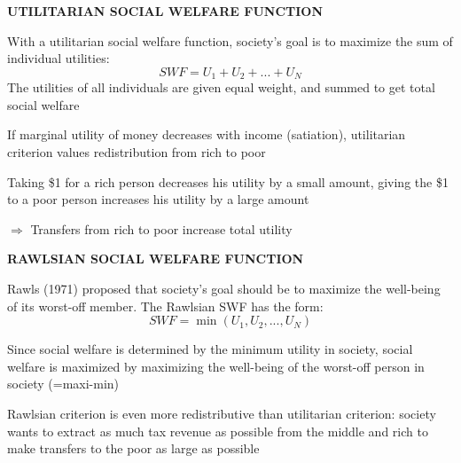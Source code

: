 \documentclass[landscape]{slides}
\begin{document}
\begin{slide}
\begin{center}
{\bf UTILITARIAN SOCIAL WELFARE FUNCTION}
\end{center}

With a utilitarian social welfare function, society's goal is to maximize the sum of individual utilities:
$$SWF=U_1+U_2+...+U_N$$
The utilities of all individuals are given equal weight, and summed to get total social welfare

If marginal utility of money decreases with income (satiation), utilitarian criterion values redistribution
from rich to poor


Taking \$1 for a rich person decreases his utility by a small amount, giving the \$1 to a poor person increases
his utility by a large amount 

$\Rightarrow$ Transfers from rich to poor increase total utility

\normalsize

\end{slide}

\begin{slide}

\end{slide}


\begin{slide}
\begin{center}
{\bf RAWLSIAN SOCIAL WELFARE FUNCTION}
\end{center}

Rawls (1971) proposed that society's goal should be to maximize the well-being of its worst-off member. The Rawlsian SWF has the form:
$$SWF=\min(U_1,U_2,...,U_N)$$

Since social welfare is determined by the minimum utility in society, social welfare is maximized by maximizing the well-being of the worst-off person in society (=maxi-min)

Rawlsian criterion is even more redistributive than utilitarian criterion: society wants to extract as much tax
revenue as possible from the middle and rich to make transfers to the poor as large as possible

\end{slide}
\end{document}
